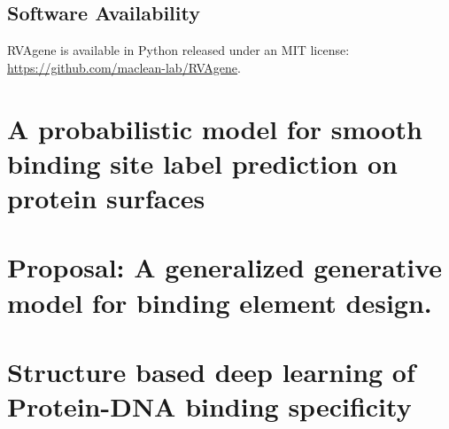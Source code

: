 \documentclass[letterpaper,11pt]{report}
\begin{document}
\section*{Software Availability}
RVAgene is available in Python released under an MIT license:  \url{https://github.com/maclean-lab/RVAgene}.



% 

\chapter{A probabilistic model for smooth binding site label prediction on protein surfaces}
\label{cha:research_topic_2}

\vspace*{0.35in}

\begin{flushleft}




\end{flushleft}







\chapter{Proposal:  A generalized generative model for binding element design.}





\chapter{Structure based deep learning of Protein-DNA binding specificity}


\end{document}
